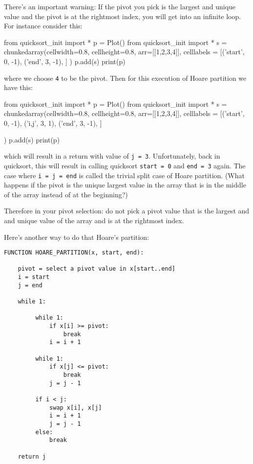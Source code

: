 There's an important warning:
If the pivot you pick
is the largest and unique value and the pivot is
at the rightmost index,
you will get into an infinite loop.
For instance consider this:
\begin{python}
from quicksort_init import *
p = Plot()
from quicksort_init import *
s = chunkedarray(cellwidth=0.8, 
                   cellheight=0.8,
                   arr=[[1,2,3,4]],
                   celllabels = [('start', 0, -1),
                                 ('end',   3, -1),
                                ]
)
p.add(s)
print(p)
\end{python}
where we choose \verb!4! to be the pivot.
Then for this execution of Hoare partition we have this:
\begin{python}
from quicksort_init import *
p = Plot()
from quicksort_init import *
s = chunkedarray(cellwidth=0.8, 
                   cellheight=0.8,
                   arr=[[1,2,3,4]],
                   celllabels = [('start', 0, -1),
                                 ('i,j', 3, 1),
                                 ('end',   3, -1),
                                ]
                                
)
p.add(s)
print(p)
\end{python}
which will result in a return with value of \verb!j = 3!.
Unfortunately, back in quicksort, this will result in
calling quicksort \verb!start = 0! and \verb!end = 3! again.
The case where \verb!i = j = end! is called the trivial split case of
Hoare partition.
(What happens if the pivot is the unique largest value in the array
that is in the middle of the array instead of at the beginning?)

Therefore in your pivot selection:
do not pick a pivot value that is the largest and and unique value
of the array and is at the rightmost index.

Here's another way to do that Hoare's partition:
\begin{Verbatim}[frame=single,fontsize=\footnotesize]
FUNCTION HOARE_PARTITION(x, start, end):

    pivot = select a pivot value in x[start..end]
    i = start
    j = end

    while 1:

         while 1:
             if x[i] >= pivot:
                 break
             i = i + 1

         while 1:
             if x[j] <= pivot:
                 break
             j = j - 1

         if i < j:
             swap x[i], x[j]
             i = i + 1
             j = j - 1
         else:
             break

    return j
\end{Verbatim}



